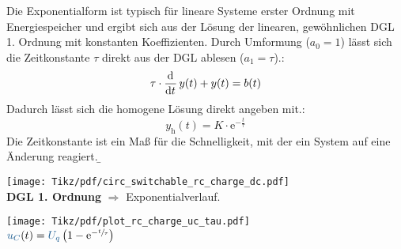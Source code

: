 \begin{frame}[t]
{    %
    Die Exponentialform ist typisch für lineare Systeme erster Ordnung mit Energiespeicher
    und ergibt sich aus der Lösung der linearen, gewöhnlichen DGL 1. Ordnung mit konstanten Koeffizienten.
    Durch Umformung ($a_0=1$) lässt sich die Zeitkonstante $\tau$ direkt aus der DGL ablesen ($a_1=\tau$).:
    \begin{equation}\label{eq:dgl:tau}
        \tau \cdot \frac{\mathrm{d}^{{}}}{\mathrm{d}t^{{}}}\,y(t) + y(t) = b(t)
    \end{equation}
    Dadurch lässt sich die homogene Lösung direkt angeben mit.:
    \begin{equation}
        y_{\mathrm{h}}(t) = K\cdot\mathrm{e}^{-\frac{t}{\tau}}
    \end{equation}
    Die Zeitkonstante ist ein Maß für die Schnelligkeit, mit der ein System auf eine Änderung reagiert.
    }%
\b{%
\begin{minipage}{\textwidth}\centering%
\begin{minipage}[t][][t]{0.48\textwidth}\centering\vspace{0cm}%
    \texttt{[image: Tikz/pdf/circ\_switchable\_rc\_charge\_dc.pdf]}\\[4pt]
    \textbf{DGL 1. Ordnung} $\Rightarrow$ Exponentialverlauf.
\end{minipage}%
\pause%
\begin{minipage}[t][][t]{0.48\textwidth}\centering\vspace{0cm}%
    \texttt{[image: Tikz/pdf/plot\_rc\_charge\_uc\_tau.pdf]}\\
    $\ecv{u_C}(t) = \ecv{U_q} \left( 1 - \mathrm{e}^{-\sfrac{t}{\tau}} \right)$
\end{minipage}%
\pause%
\vspace{1cm}%


\end{minipage}}
\end{frame}
